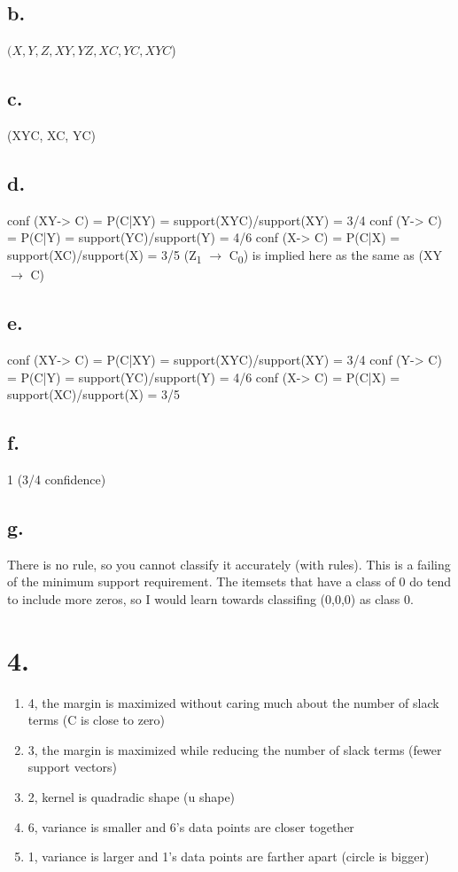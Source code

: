 \documentclass[11pt]{article}
\begin{document}
\subsection*{b.}
\label{sec:orge3f8222}
\((X, Y, Z, XY, YZ, XC, YC, XYC\))

\subsection*{c.}
\label{sec:org62a49dc}
(XYC, XC, YC)

\subsection*{d.}
\label{sec:orge61c609}
conf (XY-> C) = P(C|XY) = support(XYC)/support(XY) = 3/4
conf (Y-> C) = P(C|Y) = support(YC)/support(Y) = 4/6
conf (X-> C) = P(C|X) = support(XC)/support(X) = 3/5
(Z\textsubscript{1} \(\to\) C\textsubscript{0}) is implied here as the same as (XY \(\to\) C)
\subsection*{e.}
\label{sec:org52e34e6}
conf (XY-> C) = P(C|XY) = support(XYC)/support(XY) = 3/4
conf (Y-> C) = P(C|Y) = support(YC)/support(Y) = 4/6
conf (X-> C) = P(C|X) = support(XC)/support(X) = 3/5
\subsection*{f.}
\label{sec:org4dc7848}
1 (3/4 confidence)
\subsection*{g.}
\label{sec:org822eb61}
There is no rule, so you cannot classify it accurately (with rules). This is a
failing of the minimum support requirement. The itemsets that have a class of 0
do tend to include more zeros, so I would learn towards classifing (0,0,0) as
class 0.
\section*{4.}
\label{sec:org97deed3}
\begin{enumerate}
\item 4, the margin is maximized without caring much about the number of slack
terms (C is close to zero)
\item 3, the margin is maximized while reducing the number of slack terms (fewer
support vectors)
\item 2, kernel is quadradic shape (u shape)
\item 6, variance is smaller and 6's data points are closer together
\item 1, variance is larger and 1's data points are farther apart (circle is bigger)
\end{enumerate}
\end{document}
